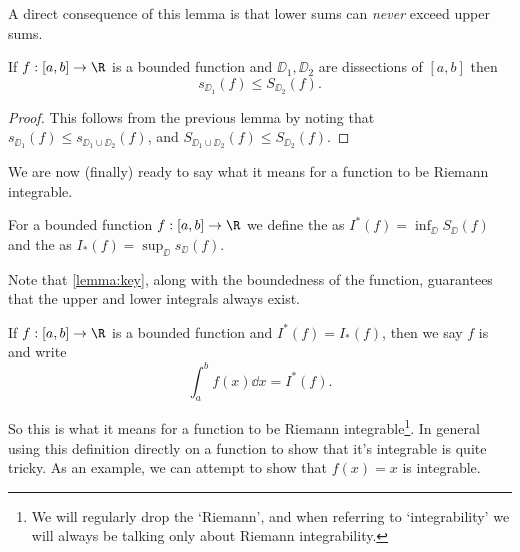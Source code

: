 A direct consequence of this lemma is that lower sums can \emph{never} exceed upper sums.

\begin{lemma}\label{lemma:key}
	If $f: [a, b] \rightarrow \R$ is a bounded function and $\DD_1, \DD_2$ are dissections of $[a, b]$ then
	$$
s_{\DD_1}(f) \leq S_{\DD_2}(f).
	$$
\end{lemma}
\begin{proof}
	This follows from the previous lemma by noting that $s_{\DD_1}(f) \leq s_{\DD_1 \cup \DD_2}(f)$, and $S_{\DD_1 \cup \DD_2}(f) \leq S_{\DD_2} (f)$.
\end{proof}

We are now (finally) ready to say what it means for a function to be Riemann integrable.

\begin{definition}
	For a bounded function $f:[a, b] \rightarrow \R$ we define the  as $I^*(f) = \inf_{\DD} S_\DD(f)$ and the  as $I_*(f) = \sup_{\DD} s_\DD(f)$. 
\end{definition}

Note that \autoref{lemma:key}, along with the boundedness of the function, guarantees that the upper and lower integrals always exist.

\begin{definition}
	If $f:[a, b] \rightarrow \R$ is a bounded function and $I^*(f) = I_*(f)$, then we say $f$ is  and write
	$$
	\int_a^b f(x)\dd x = I^*(f).
	$$
\end{definition}

So this is what it means for a function to be Riemann integrable\footnote{We will regularly drop the `Riemann', and when referring to `integrability' we will always be talking only about Riemann integrability.}. In general using this definition directly on a function to show that it's integrable is quite tricky. As an example, we can attempt to show that $f(x) = x$ is integrable.

